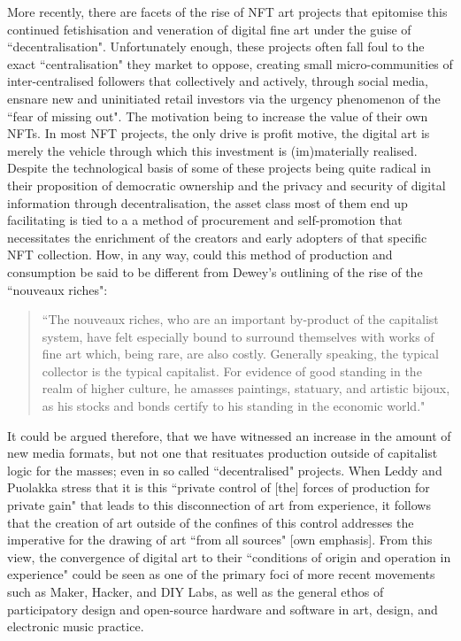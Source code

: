 More recently, there are facets of the rise of NFT art projects that epitomise this continued fetishisation and veneration of digital fine art under the guise of ``decentralisation". Unfortunately enough, these projects often fall foul to the exact ``centralisation" they market to oppose, creating small micro-communities of inter-centralised followers that collectively and actively, through social media, ensnare new and uninitiated retail investors via the urgency phenomenon of the ``fear of missing out". The motivation being to increase the value of their own NFTs. In most NFT projects, the only drive is profit motive, the digital art is merely the vehicle through which this investment is (im)materially realised. Despite the technological basis of some of these projects being quite radical in their proposition of democratic ownership and the privacy and security of digital information through decentralisation, the asset class most of them end up facilitating is tied to a a method of procurement and self-promotion that necessitates the enrichment of the creators and early adopters of that specific NFT collection. How, in any way, could this method of production and consumption be said to be different from Dewey's outlining of the rise of the ``nouveaux riches":
\begin{quote}
    ``The nouveaux riches, who are an important by-product of the capitalist system, have felt especially bound to surround themselves with works of fine art which, being rare, are also costly. Generally speaking, the typical collector is the typical capitalist. For evidence of good standing in the realm of higher culture, he amasses paintings, statuary, and artistic bijoux, as his stocks and bonds certify to his standing in the economic world." \citeyearpar[p. 7]{dewey1934}
\end{quote}
It could be argued therefore, that we have witnessed an increase in the amount of new media formats, but not one that resituates production outside of capitalist logic for the masses; even in so called ``decentralised" projects. When Leddy and Puolakka stress that it is this ``private control of [the] forces of production for private gain" that leads to this disconnection of art from experience, it follows that the creation of art outside of the confines of this control addresses the imperative for the drawing of art ``from all sources" [own emphasis]. From this view, the convergence of digital art to their ``conditions of origin and operation in experience" could be seen as one of the primary foci of more recent movements such as Maker, Hacker, and DIY Labs, as well as the general ethos of participatory design and open-source hardware and software in art, design, and electronic music practice.

